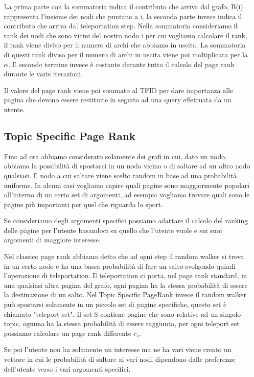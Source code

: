 \documentclass[14pt]{extreport}
\begin{document}
La prima parte con la sommatoria indica il contributo che arriva dal grafo, B(i) rappresenta l'insieme dei nodi che puntano a i, la seconda parte invece indica il contributo che arriva dal teleportation step.
Nella sommatoria consideriamo il rank dei nodi che sono vicini del nostro nodo i per cui vogliamo calcolare il rank, il rank viene diviso per il numero di archi che abbiamo in uscita. La sommatoria di questi rank diviso per il numero di archi in uscita viene poi moltiplicata per la $\alpha$. 
Il secondo termine invece è costante durante tutto il calcolo del page rank durante le varie iterazioni.

Il valore del page rank viene poi sommato al TFID per dare importanza alle pagina che devono essere restituite in seguito ad una query effettuata da un utente.

\subsection{Topic Specific Page Rank}

Fino ad ora abbiamo considerato solamente dei grafi in cui, dato un nodo, abbiamo la possibilità di spostarci in un nodo vicino o di saltare ad un altro nodo qualsiasi. Il nodo a cui saltare viene scelto random in base ad una probabilità uniforme.
In alcuni casi vogliamo capire quali pagine sono maggiormente popolari all'interno di un certo set di argomenti, ad esempio vogliamo trovare quali sono le pagine più importanti per quel che riguarda lo sport.

Se consideriamo degli argomenti specifici possiamo adattare il calcolo del ranking delle pagine per l'utente basandoci su quello che l'utente vuole e sui suoi argomenti di maggiore interesse.

Nel classico page rank abbiamo detto che ad ogni step il random walker si trova in un certo nodo e ha una bassa probabilità di fare un salto svolgendo quindi l'operazione di teleportation.
Il teleportation ci porta, nel page rank standard, in una qualsiasi altra pagina del grafo, ogni pagina ha la stessa probabilità di essere la destinazione di un salto.
Nel Topic Specific PageRank invece il random walker può spostarsi solamente in un piccolo set di pagine specifiche, questo set è chiamato "teleport set".
Il set S contiene pagine che sono relative ad un singolo topic, ognuna ha la stessa probabilità di essere raggiunta, per ogni teleport set possiamo calcolare un page rank differente $r_s$.


Se poi l'utente non ha solamente un interesse ma ne ha vari viene creato un vettore in cui le probabilità di saltare ai vari nodi dipendono dalle preferenze dell'utente verso i vari argomenti specifici.
\end{document}
